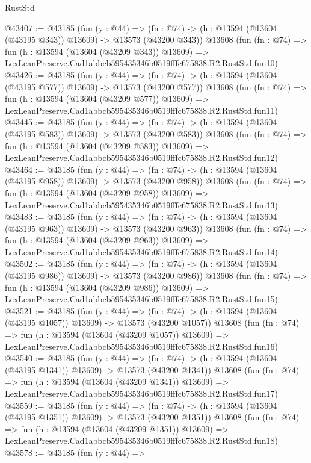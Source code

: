 \begin{lexlean}{RustStd}
\begin{coremodule}
@43407 := @43185
    (fun (y : @44) =>
    (fn : @74) -> (h : @13594 (@13604 (@43195 @343)) @13609) -> @13573 (@43200 @343))
    @13608
    (fun (fn : @74) =>
    fun (h : @13594 (@13604 (@43209 @343)) @13609) =>
    LexLeanPreserve.Cad1abbcb595435346b0519fffc675838.R2.RustStd.fun10)
@43426 := @43185
    (fun (y : @44) =>
    (fn : @74) -> (h : @13594 (@13604 (@43195 @577)) @13609) -> @13573 (@43200 @577))
    @13608
    (fun (fn : @74) =>
    fun (h : @13594 (@13604 (@43209 @577)) @13609) =>
    LexLeanPreserve.Cad1abbcb595435346b0519fffc675838.R2.RustStd.fun11)
@43445 := @43185
    (fun (y : @44) =>
    (fn : @74) -> (h : @13594 (@13604 (@43195 @583)) @13609) -> @13573 (@43200 @583))
    @13608
    (fun (fn : @74) =>
    fun (h : @13594 (@13604 (@43209 @583)) @13609) =>
    LexLeanPreserve.Cad1abbcb595435346b0519fffc675838.R2.RustStd.fun12)
@43464 := @43185
    (fun (y : @44) =>
    (fn : @74) -> (h : @13594 (@13604 (@43195 @958)) @13609) -> @13573 (@43200 @958))
    @13608
    (fun (fn : @74) =>
    fun (h : @13594 (@13604 (@43209 @958)) @13609) =>
    LexLeanPreserve.Cad1abbcb595435346b0519fffc675838.R2.RustStd.fun13)
@43483 := @43185
    (fun (y : @44) =>
    (fn : @74) -> (h : @13594 (@13604 (@43195 @963)) @13609) -> @13573 (@43200 @963))
    @13608
    (fun (fn : @74) =>
    fun (h : @13594 (@13604 (@43209 @963)) @13609) =>
    LexLeanPreserve.Cad1abbcb595435346b0519fffc675838.R2.RustStd.fun14)
@43502 := @43185
    (fun (y : @44) =>
    (fn : @74) -> (h : @13594 (@13604 (@43195 @986)) @13609) -> @13573 (@43200 @986))
    @13608
    (fun (fn : @74) =>
    fun (h : @13594 (@13604 (@43209 @986)) @13609) =>
    LexLeanPreserve.Cad1abbcb595435346b0519fffc675838.R2.RustStd.fun15)
@43521 := @43185
    (fun (y : @44) =>
    (fn : @74) -> (h : @13594 (@13604 (@43195 @1057)) @13609) -> @13573 (@43200 @1057))
    @13608
    (fun (fn : @74) =>
    fun (h : @13594 (@13604 (@43209 @1057)) @13609) =>
    LexLeanPreserve.Cad1abbcb595435346b0519fffc675838.R2.RustStd.fun16)
@43540 := @43185
    (fun (y : @44) =>
    (fn : @74) -> (h : @13594 (@13604 (@43195 @1341)) @13609) -> @13573 (@43200 @1341))
    @13608
    (fun (fn : @74) =>
    fun (h : @13594 (@13604 (@43209 @1341)) @13609) =>
    LexLeanPreserve.Cad1abbcb595435346b0519fffc675838.R2.RustStd.fun17)
@43559 := @43185
    (fun (y : @44) =>
    (fn : @74) -> (h : @13594 (@13604 (@43195 @1351)) @13609) -> @13573 (@43200 @1351))
    @13608
    (fun (fn : @74) =>
    fun (h : @13594 (@13604 (@43209 @1351)) @13609) =>
    LexLeanPreserve.Cad1abbcb595435346b0519fffc675838.R2.RustStd.fun18)
@43578 := @43185
    (fun (y : @44) =>

\end{coremodule}
\end{lexlean}
